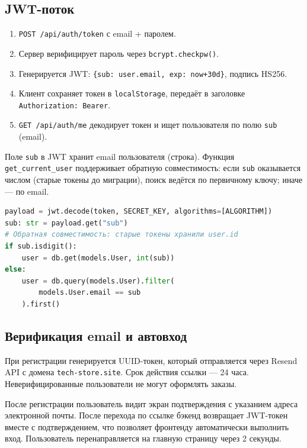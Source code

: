 \documentclass[14pt,a4paper]{extreport}
\begin{document}
\subsection{JWT-поток}
\begin{enumerate}
  \item \texttt{POST /api/auth/token} с email + паролем.
  \item Сервер верифицирует пароль через \texttt{bcrypt.checkpw()}.
  \item Генерируется JWT: \texttt{\{sub: user.email, exp: now+30d\}}, подпись HS256.
  \item Клиент сохраняет токен в \texttt{localStorage}, передаёт в заголовке \texttt{Authorization: Bearer}.
  \item \texttt{GET /api/auth/me} декодирует токен и ищет пользователя по полю \texttt{sub} (email).
\end{enumerate}

Поле \texttt{sub} в JWT хранит email пользователя (строка). Функция \texttt{get\_current\_user} поддерживает обратную совместимость: если \texttt{sub} оказывается числом (старые токены до миграции), поиск ведётся по первичному ключу; иначе --- по email.

\begin{lstlisting}[language=Python, caption={Декодирование JWT и поиск пользователя (auth.py)}]
payload = jwt.decode(token, SECRET_KEY, algorithms=[ALGORITHM])
sub: str = payload.get("sub")
# Обратная совместимость: старые токены хранили user.id
if sub.isdigit():
    user = db.get(models.User, int(sub))
else:
    user = db.query(models.User).filter(
        models.User.email == sub
    ).first()
\end{lstlisting}

\subsection{Верификация email и автовход}

При регистрации генерируется UUID-токен, который отправляется через Resend API с домена \texttt{tech-store.site}. Срок действия ссылки --- 24 часа. Неверифицированные пользователи не могут оформлять заказы.

После регистрации пользователь видит экран подтверждения с указанием адреса электронной почты. После перехода по ссылке бэкенд возвращает JWT-токен вместе с подтверждением, что позволяет фронтенду автоматически выполнить вход. Пользователь перенаправляется на главную страницу через 2 секунды.
\end{document}
